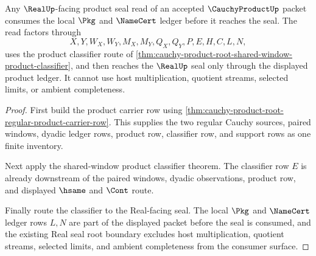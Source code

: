 \begin{theorem}
\label{thm:cauchy-product-root-real-seal-product-ledger}
Any $\RealUp$-facing product seal read of an accepted $\CauchyProductUp$ packet consumes the local $\Pkg$ and $\NameCert$ ledger before it reaches the seal. The read factors through
$$
X,Y,W_X,W_Y,M_X,M_Y,Q_X,Q_Y,P,E,H,C,L,N,
$$
uses the product classifier route of \autoref{thm:cauchy-product-root-shared-window-product-classifier}, and then reaches the $\RealUp$ seal only through the displayed product ledger. It cannot use host multiplication, quotient streams, selected limits, or ambient completeness.
\end{theorem}
\begin{proof}
First build the product carrier row using \autoref{thm:cauchy-product-root-regular-product-carrier-row}. This supplies the two regular Cauchy sources, paired windows, dyadic ledger rows, product row, classifier row, and support rows as one finite inventory.

Next apply the shared-window product classifier theorem. The classifier row $E$ is already downstream of the paired windows, dyadic observations, product row, and displayed $\hsame$ and $\Cont$ route.

Finally route the classifier to the Real-facing seal. The local $\Pkg$ and $\NameCert$ ledger rows $L,N$ are part of the displayed packet before the seal is consumed, and the existing Real seal root boundary excludes host multiplication, quotient streams, selected limits, and ambient completeness from the consumer surface.
\end{proof}


